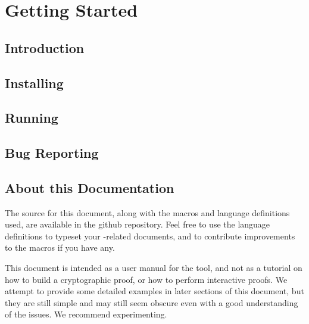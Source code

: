 \chapter{Getting Started}

\section{Introduction}

\section{Installing \EasyCrypt}

\section{Running \EasyCrypt}

\section{Bug Reporting}

\section{About this Documentation}

The source for this document, along with the macros and language
definitions used, are available in the github repository. Feel free to
use the language definitions to typeset your \EasyCrypt-related
documents, and to contribute improvements to the macros if you have
any.

This document is intended as a user manual for the \EasyCrypt tool,
and not as a tutorial on how to build a cryptographic proof, or how to
perform interactive proofs. We attempt to provide some detailed
examples in later sections of this document, but they are still simple
and may still seem obscure even with a good understanding of the
issues. We recommend experimenting.
